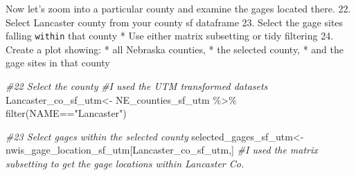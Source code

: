 \documentclass[
]{article}
\newenvironment{Shaded}{\begin{snugshade}}{\end{snugshade}}
\newcommand{\CommentTok}[1]{\textcolor[rgb]{0.56,0.35,0.01}{\textit{#1}}}
\newcommand{\FunctionTok}[1]{\textcolor[rgb]{0.00,0.00,0.00}{#1}}
\newcommand{\NormalTok}[1]{#1}
\newcommand{\OtherTok}[1]{\textcolor[rgb]{0.56,0.35,0.01}{#1}}
\newcommand{\SpecialCharTok}[1]{\textcolor[rgb]{0.00,0.00,0.00}{#1}}
\newcommand{\StringTok}[1]{\textcolor[rgb]{0.31,0.60,0.02}{#1}}
\begin{document}
Now let's zoom into a particular county and examine the gages located
there. 22. Select Lancaster county from your county sf dataframe 23.
Select the gage sites falling \texttt{within} that county * Use either
matrix subsetting or tidy filtering 24. Create a plot showing: * all
Nebraska counties, * the selected county, * and the gage sites in that
county

\begin{Shaded}
\begin{Highlighting}[]
\CommentTok{\#22 Select the county}
\CommentTok{\#I used the UTM transformed datasets }
\NormalTok{Lancaster\_co\_sf\_utm}\OtherTok{\textless{}{-}}\NormalTok{ NE\_counties\_sf\_utm }\SpecialCharTok{\%\textgreater{}\%}
                    \FunctionTok{filter}\NormalTok{(NAME}\SpecialCharTok{==}\StringTok{"Lancaster"}\NormalTok{)}

\CommentTok{\#23 Select gages within the selected county}
\NormalTok{selected\_gages\_sf\_utm}\OtherTok{\textless{}{-}}\NormalTok{ nwis\_gage\_location\_sf\_utm[Lancaster\_co\_sf\_utm,]}
\CommentTok{\#I used the matrix subsetting to get the gage locations within Lancaster Co. }


\end{Highlighting}
\end{Shaded}
\end{document}
